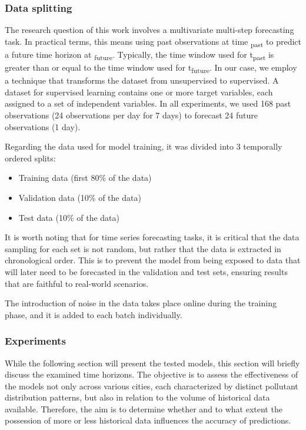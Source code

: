 \subsubsection*{Data splitting}


The research question of this work involves a multivariate multi-step forecasting task. In practical terms, this means using past observations at time \textsubscript{past} to predict a future time horizon at \textsubscript{future}. Typically, the time window used for t\textsubscript{past} is greater than or equal to the time window used for t\textsubscript{future}.
In our case, we employ a technique that transforms the dataset from unsupervised to supervised. A dataset for supervised learning contains one or more target variables, each assigned to a set of independent variables.
In all experiments, we used 168 past observations (24 observations per day for 7 days) to forecast 24 future observations (1 day).

Regarding the data used for model training, it was divided into 3 temporally ordered splits:
\begin{itemize}[noitemsep]
    \item Training data (first 80\% of the data)
    \item Validation data (10\% of the data)
    \item Test data (10\% of the data)
\end{itemize}

It is worth noting that for time series forecasting tasks, it is critical that the data sampling for each set is not random, but rather that the data is extracted in chronological order. This is to prevent the model from being exposed to data that will later need to be forecasted in the validation and test sets, ensuring results that are faithful to real-world scenarios.

The introduction of noise in the data takes place online during the training phase, and it is added to each batch individually.

\subsubsection{Experiments}

While the following section will present the tested models, this section will briefly discuss the examined time horizons. The objective is to assess the effectiveness of the models not only across various cities, each characterized by distinct pollutant distribution patterns, but also in relation to the volume of historical data available. Therefore, the aim is to determine whether and to what extent the possession of more or less historical data influences the accuracy of predictions.

